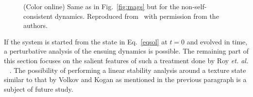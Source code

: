 \documentclass[aps,pra,floats,epsfig,pdflatex]{revtex4}                                                              %
\begin{document}
\begin{figure}
\caption{(Color online) Left Panel: Plot of Q, the time average of magnetization, as a function of $\omega$, with averaging carried over $10$ drive cycles. Right panel: Plot of $m(t)$ as a function of $\omega t/2\pi$ for representative values of $\omega$ indicated in the legend. A few representative values of the adiabatic magnetization $m^{adb}(t)$ is shown using crosses. In both panels, the equilibrium magnetization $m(0)$ is indicated by a solid (red) horizontal line and all parameters are same as in Fig.~\ref{fig:magcomp}. Reproduced from~\cite{ourpaper} with permission from the authors.} 
\label{fig:mags}
\caption{(Color online) Same as in Fig.~\ref{fig:mags} but for the
non-self-consistent dynamics. Reproduced from~\cite{ourpaper} with permission from the authors.} \label{fig:mag:nsc}
\end{figure}
 {If the system is started from the state in Eq.}~\ref{eqsol}  {at $t=0$ and evolved in time, a perturbative analysis of the ensuing dynamics is possible. The remaining part of this section focuses on the salient features of such a treatment done by Roy \textit{et. al.}} ~\cite{ourpaper} {. The possibility of performing a linear stability analysis around a texture state similar to that by Volkov and Kogan as mentioned in the previous paragraph is a subject of future study.}
\end{document}
